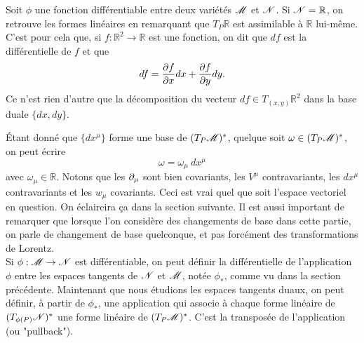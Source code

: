 \documentclass[a4paper,11pt]{report}
\begin{document}
                \begin{rmk}
                    Soit $\phi$ une fonction différentiable entre deux variétés $\mathscr{M}$ et $\mathscr{N}$. Si $\mathscr{N}=\mathbb{R}$, on retrouve les formes linéaires en remarquant que $T_P\mathbb{R}$ est assimilable à $\mathbb{R}$ lui-même. C'est pour cela que, si $f:\mathbb{R}^2\to\mathbb{R}$ est une fonction, on dit que $df$ est la différentielle de $f$ et que
                    \begin{equation}
                        df = \frac{\partial f}{\partial x} dx + \frac{\partial f}{\partial y} dy.
                    \end{equation}
                    Ce n'est rien d'autre que la décomposition du vecteur $df\in T_{(x,y)}\mathbb{R}^2$ dans la base duale $\{dx,dy\}$.
                \end{rmk}
                
                Étant donné que $\{dx^\mu\}$ forme une base de $(T_P\mathscr{M})^*$, quelque soit $\omega\in(T_P\mathscr{M})^*$, on peut écrire
                \begin{equation}
                    \omega = \omega_\mu~dx^\mu
                \end{equation}
                avec $\omega_\mu\in\mathbb{R}$. Notons que les $\partial_\mu$ sont bien covariants, les $V^\mu$ contravariants, les $dx^\mu$ contravariants et les $w_\mu$ covariants. Ceci est vrai quel que soit l'espace vectoriel en question. On éclaircira ça dans la section suivante. Il est aussi important de remarquer que lorsque l'on considère des changements de base dans cette partie, on parle de changement de base quelconque, et pas forcément des transformations de Lorentz.\\
                
                Si $\phi:\mathscr{M}\to\mathscr{N}$ est différentiable, on peut définir la différentielle de l'application $\phi$ entre les espaces tangents de $\mathscr{N}$ et $\mathscr{M}$, notée $\phi_*$, comme vu dans la section précédente. Maintenant que nous étudions les espaces tangents duaux, on peut définir, à partir de $\phi_*$, une application qui associe à chaque forme linéaire de $(T_{\phi(P)}\mathscr{N})^*$ une forme linéaire de $(T_P\mathscr{M})^*$. C'est la transposée de l'application (ou "pullback").
                
\end{document}
